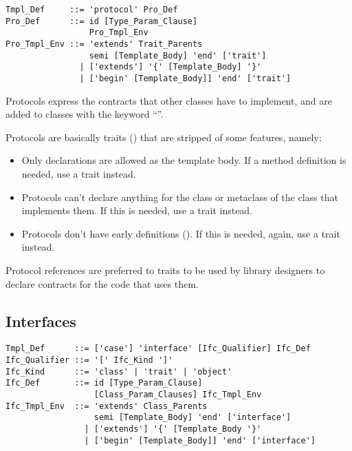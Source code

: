 \syntax\begin{lstlisting}
Tmpl_Def     ::= 'protocol' Pro_Def
Pro_Def      ::= id [Type_Param_Clause]
                 Pro_Tmpl_Env
Pro_Tmpl_Env ::= 'extends' Trait_Parents
                 semi [Template_Body] 'end' ['trait']
               | ['extends'] '{' [Template_Body] '}'
               | ['begin' [Template_Body]] 'end' ['trait']
\end{lstlisting}

Protocols express the contracts that other classes have to implement, and are added to classes with the keyword ``''. 

Protocols are basically traits () that are stripped of some features, namely: 
\begin{itemize}
\item
Only declarations are allowed as the template body. If a method definition is needed, use a trait instead. 

\item
Protocols can't declare anything for the class or metaclass of the class that implements them. If this is needed, use a trait instead. 

\item
Protocols don't have early definitions (). If this is needed, again, use a trait instead. 
\end{itemize}

Protocol references are preferred to traits to be used by library designers to declare contracts for the code that uses them. 







\subsection{Interfaces}
\label{sec:interfaces}

\syntax\begin{lstlisting}
Tmpl_Def      ::= ['case'] 'interface' [Ifc_Qualifier] Ifc_Def
Ifc_Qualifier ::= '[' Ifc_Kind ']'
Ifc_Kind      ::= 'class' | 'trait' | 'object'
Ifc_Def       ::= id [Type_Param_Clause]
                  [Class_Param_Clauses] Ifc_Tmpl_Env
Ifc_Tmpl_Env  ::= 'extends' Class_Parents
                  semi [Template_Body] 'end' ['interface']
                | ['extends'] '{' [Template_Body '}'
                | ['begin' [Template_Body]] 'end' ['interface']
\end{lstlisting}

